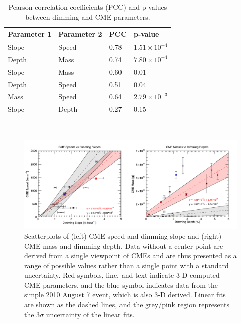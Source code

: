 \begin{table}[!h]
    \caption[Dimming-CME parameter correlations]{
        Pearson correlation coefficients (PCC) and p-values between dimming and CME parameters.
    }
    \begin{center}
    \begin{tabular}{|l|l|l|l|} \hline
	Parameter 1 & Parameter 2 & PCC & p-value \\ \hline \hline
	Slope & Speed & 0.78 & $1.51 \times 10^{-4}$ \\ \hline
	Depth & Mass & 0.74 & $7.80 \times 10^{-4}$ \\ \hline
	Slope & Mass & 0.60 & 0.01 \\ \hline
	Depth & Speed & 0.51 & 0.04 \\ \hline
	Mass & Speed & 0.64 & $2.79 \times 10^{-3}$ \\ \hline
	Slope & Depth & 0.27 & 0.15 \\ \hline
	\end{tabular}
    \\ \rule{0mm}{5mm}
    \end{center}
    \label{tab:correlations}
\end{table}

\begin{figure}[!h]
    \begin{center}
	    \includegraphics[width=\textwidth]{Images/Correlations.png}
    \end{center}
    \caption[Dimming-CME correlations]{
        Scatterplots of (left) CME speed and dimming slope and (right) CME mass and dimming depth. Data without a 
        center-point are derived from a single viewpoint of CMEs and are thus presented as a range of possible values 
        rather than a single point with a standard uncertainty. Red symbols, line, and text indicate 3-D computed CME 
        parameters, and the blue symbol indicates data from the simple 2010 August 7 event, which is also 3-D derived. 
        Linear fits are shown as the dashed lines, and the grey/pink region represents the $3\sigma$ uncertainty of the linear 
        fits.
   	}
    \label{fig:correlations}
\end{figure}

